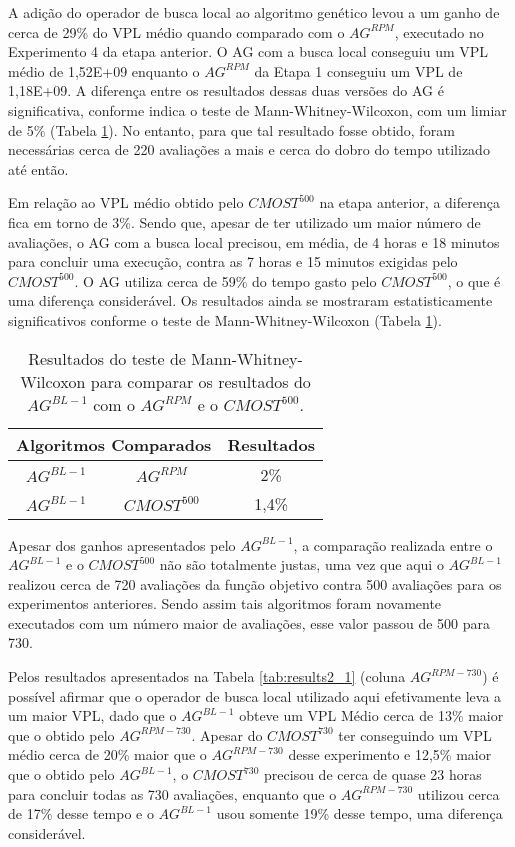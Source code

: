 A adição do operador de busca local ao algoritmo genético levou a um ganho de cerca de 29\% do VPL médio quando comparado com o $AG^{RPM}$, executado no Experimento 4 da etapa anterior. O AG com a busca local conseguiu um VPL médio de 1,52E+09 enquanto o $AG^{RPM}$ da Etapa 1 conseguiu um VPL de 1,18E+09. A diferença entre os resultados dessas duas versões do AG é significativa, conforme indica o teste de Mann-Whitney-Wilcoxon, com um limiar de 5\% (Tabela \ref{tab:mw6_1}). No entanto, para que tal resultado fosse obtido, foram necessárias cerca de 220 avaliações a mais e cerca do dobro do tempo utilizado até então.

Em relação ao VPL médio obtido pelo $CMOST^{500}$ na etapa anterior, a diferença fica em torno de 3\%. Sendo que, apesar de ter utilizado um maior número de avaliações, o AG com a busca local precisou, em média, de 4 horas e 18 minutos para concluir uma execução, contra as 7 horas e 15 minutos exigidas pelo $CMOST^{500}$. O AG utiliza cerca de 59\% do tempo gasto pelo $CMOST^{500}$, o que é uma diferença considerável. Os resultados ainda se mostraram estatisticamente significativos conforme o teste de Mann-Whitney-Wilcoxon  (Tabela \ref{tab:mw6_1}).

\begin{table}[H]
\centering
\caption{Resultados do teste de Mann-Whitney-Wilcoxon para comparar os resultados do $AG^{BL-1}$ com o $AG^{RPM}$ e o $CMOST^{500}$.}
\label{tab:mw6_1}
\begin{tabular}{|c|c|c|}
\hline
\multicolumn{2}{|c|}{Algoritmos Comparados} & Resultados \\ \hline
$AG^{BL-1}$ & $AG^{RPM}$ & 2\% \\ \hline
$AG^{BL-1}$ & $CMOST^{500}$ & 1,4\% \\ \hline

\end{tabular}
\end{table}

Apesar dos ganhos apresentados pelo $AG^{BL-1}$, a comparação realizada entre o $AG^{BL-1}$ e o $CMOST^{500}$ não são totalmente justas, uma vez que aqui o $AG^{BL-1}$ realizou cerca de 720 avaliações da função objetivo contra 500 avaliações para os experimentos anteriores. Sendo assim tais algoritmos foram novamente executados com um número maior de avaliações, esse valor passou de 500 para 730. 

Pelos resultados apresentados na Tabela \ref{tab:results2_1} (coluna $AG^{RPM-730}$) é possível afirmar que o operador de busca local utilizado aqui efetivamente leva a um maior VPL, dado que o $AG^{BL-1}$ obteve um VPL Médio cerca de 13\% maior que o obtido pelo $AG^{RPM-730}$. Apesar do $CMOST^{730}$ ter conseguindo um VPL médio cerca de 20\% maior que o $AG^{RPM-730}$ desse experimento e 12,5\% maior que o obtido pelo $AG^{BL-1}$, o $CMOST^{730}$ precisou de cerca de quase 23 horas para concluir todas as 730 avaliações, enquanto que o $AG^{RPM-730}$ utilizou cerca de 17\% desse tempo e o $AG^{BL-1}$ usou somente 19\% desse tempo, uma diferença considerável.

